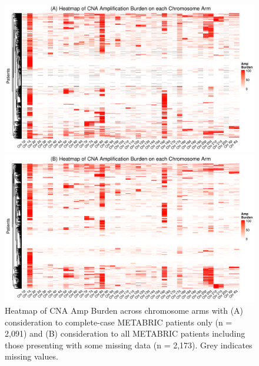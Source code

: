 \begin{figure}[!ht]
  \centering
  
  \vspace{0.8cm}
  
  \includegraphics[width = 1.05\textwidth]{../figures/Chapter_2/CNA_Amp_Burden_Heatmap_CCA.png}
  
  \vspace{1.5cm}
  
     \includegraphics[width = 1.05\textwidth]{../figures/Chapter_2/CNA_Amp_Burden_Heatmap_All.png} 

\vspace{0.8cm}

  \caption[Heatmap of CNA Amp Burden across chromosome arms.]{Heatmap of CNA Amp Burden across chromosome arms with (A) consideration to complete-case METABRIC patients only (n = 2,091) and (B) consideration to all METABRIC patients including those presenting with some missing data (n = 2,173). Grey indicates missing values.}
  \label{SurvTrees_Burden_HM_CCA}
\end{figure}
\clearpage

